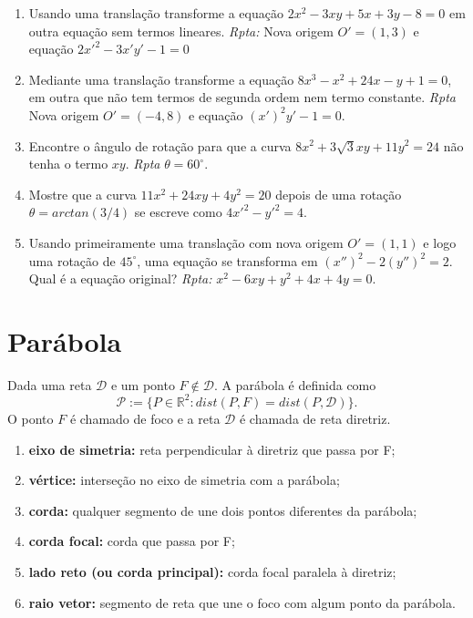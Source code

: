 \documentclass{article}
\begin{document}
   \begin{enumerate}
    \item Usando uma translação transforme a equação 
    $2x^2-3xy+5x+3y-8=0$ em outra equação sem termos lineares.
    {\it Rpta:} Nova origem $O'=(1,3)$ e equação $2x'^2-3x'y'-1=0$
    \item Mediante uma translação transforme a equação 
    $8x^3-x^2+24x-y+1=0$, em outra que não tem termos 
    de segunda ordem nem termo constante.
    {\it Rpta} Nova origem $O'=(-4,8)$ e equação $(x')^{2}y'-1=0$.
    \item Encontre o ângulo de rotação para que a curva
    $8x^2+3\sqrt{3}xy+11y^2=24$ não tenha o termo $xy$.
    {\it Rpta} $\theta=60^{\circ}$.
    \item Mostre que a curva $11x^2+24xy+4y^2=20$ depois de uma rotação 
    $\theta=arctan(3/4)$ se escreve como $4x'^2-y'^2=4$.
    \item Usando primeiramente uma translação com nova origem $O'=(1,1)$ e
    logo uma rotação de $45^{\circ}$, uma equação se transforma 
    em $(x'')^{2}-2(y'')^{2}=2$. Qual é a equação original?
    {\it Rpta:} $x^2-6xy+y^2+4x+4y=0$.
   \end{enumerate}

 \section*{Parábola} 
  
   Dada uma reta $\mathcal{D}$ e um ponto $F \notin \mathcal{D}$.
   A parábola é definida como 
   $$\mathcal{P}:=\{P \in \mathbb{R}^{2}: dist(P,F)=dist(P,\mathcal{D})\}.$$
   O ponto $F$ é chamado de foco e a reta $\mathcal{D}$ é chamada de reta diretriz.
     \begin{enumerate}
      \item {\bf eixo de simetria: } reta perpendicular à diretriz que passa por F;
      \item {\bf vértice: } interseção no eixo de simetria com a parábola;
      \item {\bf corda: } qualquer segmento de une dois pontos diferentes da parábola;
      \item {\bf corda focal: } corda que passa por F;
      \item {\bf lado reto (ou corda principal): } corda focal paralela à diretriz;
      \item {\bf raio vetor: } segmento de reta que une o foco com algum ponto da parábola. 
     \end{enumerate}
  
\end{document}
